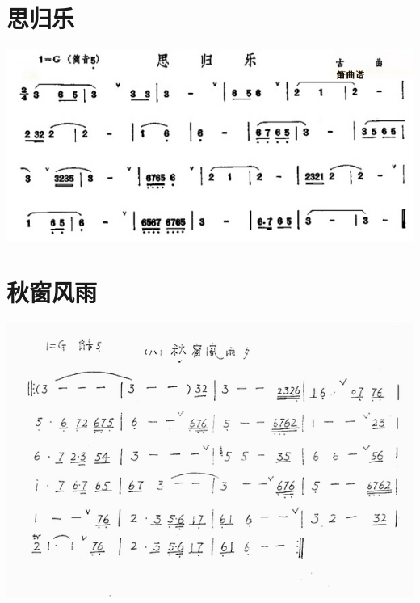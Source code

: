 \documentclass[cn,pad,chinese,chinesefont=nofont]{elegantbook}
\begin{document}
\section{思归乐}
	\includegraphics[width=\textwidth]{dongxiao/思归乐.jpg}
\section{秋窗风雨}
    \includegraphics[width=\textwidth]{dongxiao/秋窗风雨.jpg}
\end{document}

